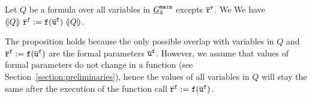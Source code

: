 \begin{proposition}
\label{propposition:invariant}
Let $Q$ be a formula over all variables in $\underline{G}^{\mathtt{{main}}}_k$ excepts $\mathtt{\overline{r}}^{\mathtt{{r}}}$. We
We have $(\!| {Q} |\!)\
  \mathtt{\overline{r}}^{\mathtt{{f}}} := \mathtt{f}
  (\overline{\mathtt{u}}^{\mathtt{{f}}})\ (\!| {Q} |\!)$.
\end{proposition}
The proposition holds because the only possible overlap with variables in $Q$ and $\mathtt{\overline{r}}^{\mathtt{{f}}} := \mathtt{f} (\overline{\mathtt{u}}^{\mathtt{{f}}})$ are the formal parameters $\overline{\mathtt{u}}^{\mathtt{{f}}}$. However, we assume that values of formal parameters do not change in a function (see Section~\ref{section:preliminaries}), hence the values of all variables in $Q$ will stay the same after the execution of the function call $\mathtt{\overline{r}}^{\mathtt{{f}}} := \mathtt{f} (\overline{\mathtt{u}}^{\mathtt{{f}}})$.

